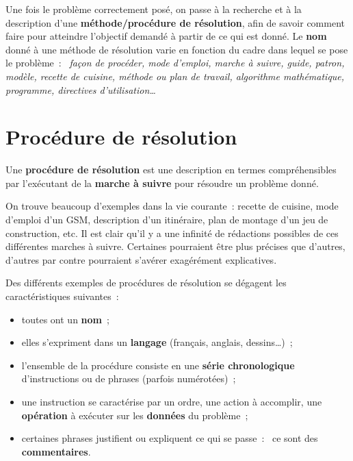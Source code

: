 			Une fois le problème correctement posé, 
			on passe à la recherche et à la description 
			d’une \textbf{méthode/procédure de résolution}, 
			afin de savoir comment faire 
			pour atteindre l’objectif demandé 
			à partir de ce qui est donné. 
			Le \textbf{nom} donné à une méthode de résolution 
			varie en fonction du cadre dans lequel se pose le problème~:~
			\textit{façon de procéder, mode d’emploi, marche à suivre, 
			guide, patron, modèle, recette de cuisine, 
			méthode ou plan de travail, algorithme mathématique, 
			programme, directives d’utilisation\dots}
	
	\section{Procédure de résolution}
	
		Une \textbf{procédure de résolution} est une description 
		en termes compréhensibles par l’exécutant 
		de la \textbf{marche à suivre} 
		pour résoudre un problème donné.
		
		On trouve beaucoup d’exemples dans la vie courante~:
		recette de cuisine, mode d’emploi d’un GSM, 
		description d’un itinéraire, 
		plan de montage d’un jeu de construction, etc. 
		Il est clair qu’il y a une infinité de rédactions possibles 
		de ces différentes marches à suivre. 
		Certaines pourraient être plus précises que d’autres,
		d’autres par contre pourraient s’avérer exagérément explicatives.		

		Des différents exemples de procédures de résolution 
		se dégagent les caractéristiques suivantes~:	
		\begin{itemize}
		\item 
			toutes ont un \textbf{nom}~;
		\item 
			elles s’expriment dans un \textbf{langage}
			(français, anglais, dessins\dots)~;
		\item 
			l’ensemble de la procédure consiste 
			en une \textbf{série chronologique}
			d’instructions ou de phrases (parfois numérotées)~;
		\item 
			une instruction se caractérise par un ordre, 
			une action à accomplir,
			une \textbf{opération} à exécuter 
			sur les \textbf{données} du problème~;
		\item 
			certaines phrases justifient ou expliquent ce qui se passe~:~
			ce sont des \textbf{commentaires}.
		\end{itemize}
	
